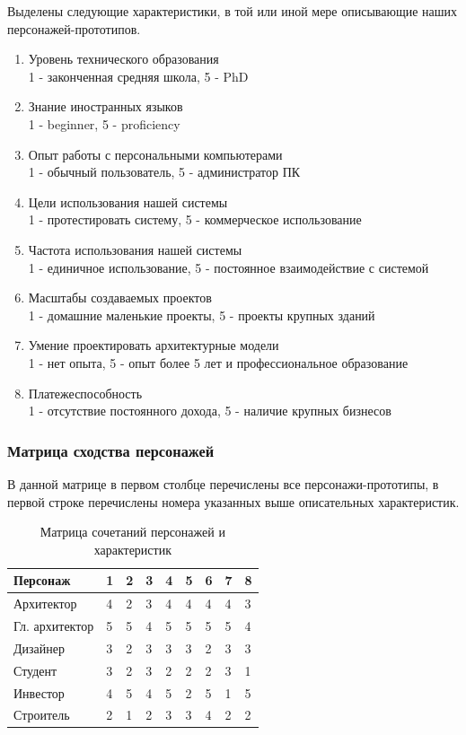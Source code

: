 \documentclass[a4paper,14pt]{extreport} %
\begin{document}
Выделены следующие характеристики, в той или иной мере описывающие наших персонажей-прототипов.
\begin{enumerate}
\item Уровень технического образования \\
1 - законченная средняя школа, 5 - PhD
\item Знание иностранных языков \\
1 - beginner, 5 - proficiency
\item Опыт работы с персональными компьютерами \\
1 - обычный пользователь, 5 - администратор ПК
\item Цели использования нашей системы \\
1 - протестировать систему, 5 - коммерческое использование
\item Частота использования нашей системы \\
1 - единичное использование, 5 - постоянное взаимодействие с системой
\item Масштабы создаваемых проектов \\
1 - домашние маленькие проекты, 5 - проекты крупных зданий
\item Умение проектировать архитектурные модели \\
1 - нет опыта, 5 - опыт более 5 лет и профессиональное образование
\item Платежеспособность \\
1 - отсутствие постоянного дохода, 5 - наличие крупных бизнесов
\end{enumerate}

\newpage
\subsubsection{Матрица сходства персонажей}

В данной матрице в первом столбце перечислены все персонажи-прототипы, в первой строке перечислены номера  указанных выше описательных характеристик.

\begin{table}[H]
\caption {Матрица  сочетаний персонажей и характеристик} \label{tab:title}
\begin{center}
\begin{tabular}{| p{4cm}  | p{1cm} | p{1cm} | p{1cm} | p{1cm} | p{1cm} | p{1cm} | p{1cm} | p{1cm} |}
\hline
\textbf{Персонаж} & \textbf{1} & \textbf{2} & \textbf{3} & \textbf{4} & \textbf{5} & \textbf{6} & \textbf{7} & \textbf{8} \\
\hline
Архитектор 		& 4 & 2 & 3 & 4 & 4 & 4 & 4 & 3 \\
\hline
Гл. архитектор	& 5 & 5 & 4 & 5 & 5 & 5 & 5 & 4 \\
\hline
Дизайнер			& 3 & 2 & 3 & 3 & 3 & 2 & 3 & 3 \\
\hline
Студент			& 3 & 2 & 3 & 2 & 2 & 2 & 3 & 1 \\
\hline
Инвестор			& 4 & 5 & 4 & 5 & 2 & 5 & 1 & 5 \\
\hline
Строитель		& 2 & 1 & 2 & 3 & 3 & 4 & 2 & 2 \\
\hline
\end{tabular}
\end{center}
\end{table}
\end{document}
